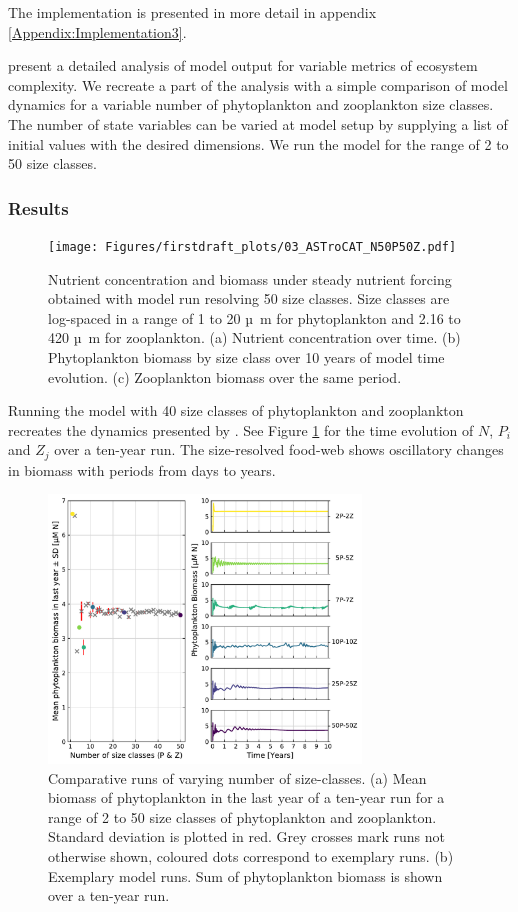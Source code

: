 \documentclass[journal abbreviation, manuscript]{copernicus}
\begin{document}
The implementation is presented in more detail in appendix \ref{Appendix:Implementation3}.

\citet{Banas2011b} present a detailed analysis of model output for variable metrics of ecosystem complexity. We recreate a part of the analysis with a simple comparison of model dynamics for a variable number of phytoplankton and zooplankton size classes. The number of state variables can be varied at model setup by supplying a list of initial values with the desired dimensions. We run the model for the range of 2 to 50 size classes.

\subsubsection{Results}
\begin{figure}[t]
\texttt{[image: Figures/firstdraft\_plots/03\_ASTroCAT\_N50P50Z.pdf]}
\caption{Nutrient concentration and biomass under steady nutrient forcing obtained with model run resolving 50 size classes. Size classes are log-spaced in a range of 1 to 20 \unit{µ m} for phytoplankton and 2.16 to 420 \unit{µ m} for zooplankton. (a) Nutrient concentration over time. (b) Phytoplankton biomass by size class over 10 years of model time evolution. (c) Zooplankton biomass over the same period.}
\label{Figure:ResultsASTroCAT_1}
\end{figure}

Running the model with 40 size classes of phytoplankton and zooplankton recreates the dynamics presented by \citet{Banas2011b}. See Figure \ref{Figure:ResultsASTroCAT_1} for the time evolution of $N$, $P_i$ and $Z_j$ over a ten-year run. The size-resolved food-web shows oscillatory changes in biomass with periods from days to years.

\begin{figure}[t]
\includegraphics[width=8.3cm]{Figures/firstdraft_plots/03_ASTroCAT_sizeclassrange.pdf}
\caption{Comparative runs of varying number of size-classes. (a) Mean biomass of phytoplankton in the last year of a ten-year run for a range of 2 to 50 size classes of phytoplankton and zooplankton. Standard deviation is plotted in red. Grey crosses mark runs not otherwise shown, coloured dots correspond to exemplary runs. (b) Exemplary model runs. Sum of phytoplankton biomass is shown over a ten-year run.}
\label{Figure:ResultsASTroCAT_2}
\end{figure}
\end{document}
